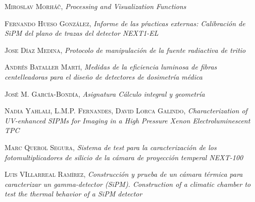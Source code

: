 \begin{thebibliography}{99}
 \textsc{Miroslav Morháč},
\textit{Processing and Visualization Functions}

 \textsc{Fernando Hueso González},
\textit{Informe de las pŕacticas externas: Calibración de SiPM del plano de trazas del detector NEXT1-EL}

 \textsc{Jose Díaz Medina},
\textit{Protocolo de manipulación de la fuente radiactiva de tritio}

 \textsc{Andrés Bataller Martí},
\textit{Medidas de la eficiencia luminosa de fibras centelleadoras para el diseño de detectores de dosimetría médica}

 \textsc{José M. García-Bondía},
\textit{Asignatura Cálculo integral y geometría}

 \textsc{Nadia Yahlali}, \textsc{L.M.P. Fernandes}, \textsc{David Lorca Galindo},
\textit{Characterization of UV-enhanced SIPMs for Imaging in a High Pressure Xenon Electroluminescent TPC}

 \textsc{Marc Querol Segura},
\textit{Sistema de test para la caracterización de los fotomultiplicadores de silicio de la cámara de proyección temperal NEXT-100}

 \textsc{Luis VIllarreal Ramírez},
\textit{Construcción y prueba de un cámara térmica para caracterizar un gamma-detector (SiPM). Construction of a climatic chamber to test the thermal behavior of a SiPM detector}
 
\end{thebibliography}